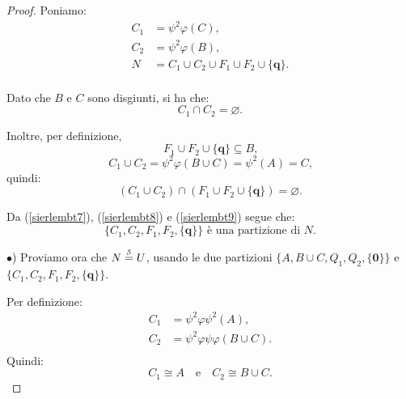 \documentclass[a4paper,oneside,11pt]{book}
\theoremstyle{definition} \newtheorem{Def}{Definizione}
\theoremstyle{plain} \newtheorem{teo}{Teorema}
\theoremstyle{plain} \newtheorem{cor}[teo]{Corollario}
\theoremstyle{definition} \newtheorem{lem}[teo]{Lemma}
\theoremstyle{plain} \newtheorem{pro}[teo]{Proposizione}
\newcommand{\ug}[1]{(\ref{#1})} %
\newcommand{\eqn}[1]{\stackrel{\text{\textit{#1}}}{=}}
\begin{document}
\begin{proof}
		Poniamo:
		\begin{equation*}
			\begin{aligned}
				C_1 &= \psi^2\varphi(C) \text{,} \\
				C_2 &= \psi^2\varphi(B) \text{,} \\
				N &= C_1 \cup C_2 \cup F_1 \cup F_2 \cup \{\mathbf{q}\} \text{.} \\
			\end{aligned}
		\end{equation*}
		
		Dato che $B$ e $C$ sono disgiunti, si ha che:
		\begin{equation}\label{sierlembt8}
			C_1 \cap C_2 = \varnothing \text{.} 
		\end{equation}
		
		Inoltre, per definizione,
		\begin{equation*}
			F_1 \cup F_2 \cup \{\mathbf{q}\} \subseteq B \text{,} 
		\end{equation*}
		\begin{equation*}
			C_1 \cup C_2 = \psi^2\varphi(B \cup C) = \psi^2(A) = C \text{,} 
		\end{equation*}
		quindi:
		\begin{equation}\label{sierlembt9}
			(C_1 \cup C_2) \cap (F_1 \cup F_2 \cup \{\mathbf{q}\}) = \varnothing \text{.} 
		\end{equation}
		
		Da \ug{sierlembt7}, \ug{sierlembt8} e \ug{sierlembt9} segue che:
		\begin{equation}\label{sierlembt10}
			\{C_1, C_2, F_1, F_2, \{\mathbf{q}\}\} \text{ è una partizione di } N \text{.} 
		\end{equation}
		
		$\bullet$) Proviamo ora che $N \eqn{5} U$, usando le due partizioni $\{A, B \cup C, Q_1, Q_2, \{\mathbf{0}\}\}$ e $\{C_1, C_2, F_1, F_2, \{\mathbf{q}\}\}$.
		
		Per definizione:
		\begin{equation*}
			\begin{aligned}
				C_1 &= \psi^2\varphi\psi^2(A) \text{,} \\
				C_2 &= \psi^2\varphi\psi\varphi(B \cup C) \text{.} \\
			\end{aligned}
		\end{equation*}
		Quindi:
		\begin{equation}\label{sierlembt11}
			C_1 \cong A \quad  \text{e} \quad C_2 \cong B \cup C \text{.} 
		\end{equation}
		

\end{proof}
\end{document}
